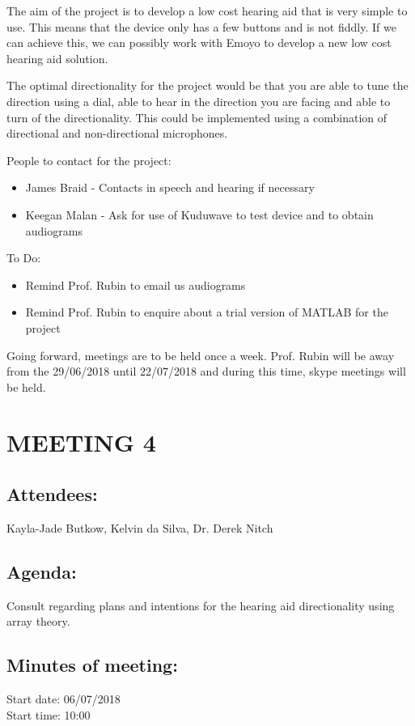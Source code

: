 \documentclass[10pt,onecolumn]{witseiepaper}
\begin{document}
The aim of the project is to develop a low cost hearing aid that is very simple to use. This means that the device only has a few buttons and is not fiddly. If we can achieve this, we can possibly work with Emoyo to develop a new low cost hearing aid solution.

The optimal directionality for the project would be that you are able to tune the direction using a dial, able to hear in the direction you are facing and able to turn of the directionality. This could be implemented using a combination of directional and non-directional microphones.

People to contact for the project:
\begin{itemize}
	\item James Braid - Contacts in speech and hearing if necessary
	\item Keegan Malan - Ask for use of Kuduwave to test device and to obtain audiograms
\end{itemize}

To Do:
\begin{itemize}
	\item Remind Prof. Rubin to email us audiograms
	\item Remind Prof. Rubin to enquire about a trial version of MATLAB for the project
\end{itemize}

Going forward, meetings are to be held once a week. Prof. Rubin will be away from the 29/06/2018 until 22/07/2018 and during this time, skype meetings will be held.

\section*{MEETING 4}
\subsection*{Attendees:}
Kayla-Jade Butkow, Kelvin da Silva, Dr. Derek Nitch
\subsection*{Agenda:} 
Consult regarding plans and intentions for the hearing aid directionality using array theory.

\subsection*{Minutes of meeting:}
Start date: 06/07/2018 \\
Start time: 10:00
\end{document}
